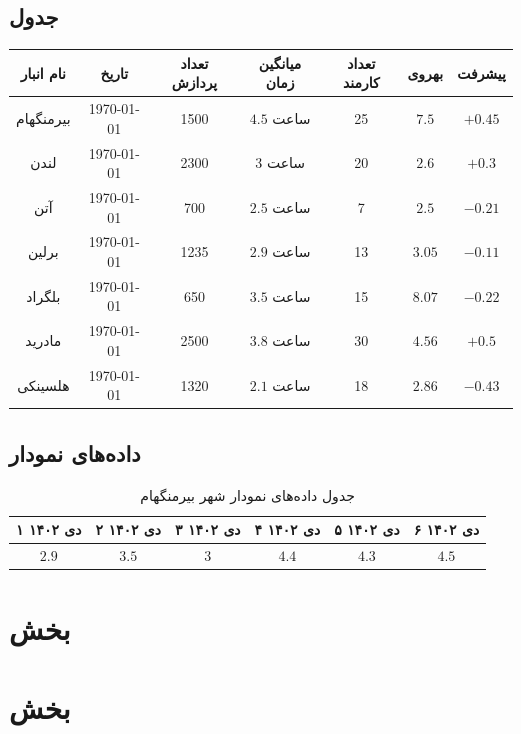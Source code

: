 \documentclass[11pt, oneside]{book}
\begin{document}
\subsection{جدول}
\begin{table}[H]
\begin{center}
\begin{adjustbox}{width=\textwidth}
\begin{tabular}{|c|c|c|c|c|c|c|}
\hline
نام انبار &
تاریخ &
تعداد پردازش &
میانگین زمان &
تعداد کارمند &
بهروی &
پیشرفت \\
\hline
\hline
بیرمنگهام &
\today &
1500 &
$4.5$ ساعت &
25 &
$7.5$ &
$+0.45$ \\
\hline
لندن &
\today &
2300 &
3 ساعت &
20 &
$2.6$ &
$+0.3$ \\
\hline
آتن &
\today &
700 &
$2.5$ ساعت &
7 &
$2.5$ &
$-0.21$ \\
\hline
برلین &
\today &
1235 &
$2.9$ ساعت &
13 &
$3.05$ &
$-0.11$ \\
\hline
بلگراد &
\today &
650 &
$3.5$ ساعت &
15 &
$8.07$ &
$-0.22$ \\
\hline
مادرید &
\today &
2500 &
$3.8$ ساعت &
30 &
$4.56$ &
$+0.5$ \\
\hline
هلسینکی &
\today &
1320 &
$2.1$ ساعت &
18 &
$2.86$ &
$-0.43$ \\
\hline
\end{tabular}
\end{adjustbox}
\end{center}
\end{table}

\subsection{داده‌های نمودار}
\begin{table}[H]
\caption{جدول داده‌های نمودار شهر بیرمنگهام}
\begin{center}
\begin{tabular}{|c|c|c|c|c|c|}
\hline
۱ دی ۱۴۰۲ &
۲ دی ۱۴۰۲ &
۳ دی ۱۴۰۲ &
۴ دی ۱۴۰۲ &
۵ دی ۱۴۰۲ &
۶ دی ۱۴۰۲ \\
\hline
\hline
$2.9$ &
$3.5$ &
$3$ &
$4.4$ &
$4.3$ &
$4.5$ \\
\hline
\end{tabular}
\end{center}
\end{table}
\section{بخش }

\section{بخش }
\end{document}
